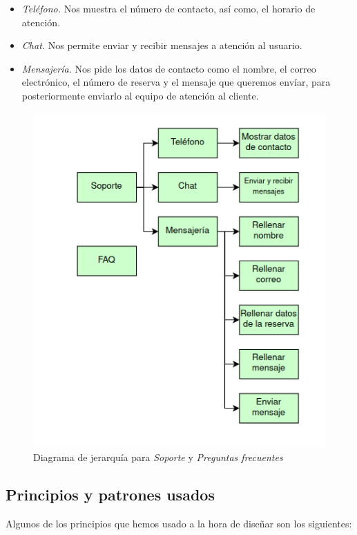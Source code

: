 \begin{itemize}
      \item \textit{Teléfono.} Nos muestra el número de contacto, así como, el horario de
            atención.
      \item \textit{Chat.} Nos permite enviar y recibir mensajes a atención al usuario.
      \item \textit{Mensajería.} Nos pide los datos de contacto como el nombre, el correo
            electrónico, el número de reserva y el mensaje que queremos envíar, para posteriormente
            enviarlo al equipo de atención al cliente.
\end{itemize}

\begin{figure}
      \centering
      \includegraphics[width=0.8\linewidth]{./Imagenes/jerarquia-soporte.png}
      \caption{Diagrama de jerarquía para \textit{Soporte} y \textit{Preguntas frecuentes}}
      \label{fig:jerarquias4}
\end{figure}

\subsection{Principios y patrones usados}

Algunos de los principios que hemos usado a la hora de diseñar son los siguientes:

